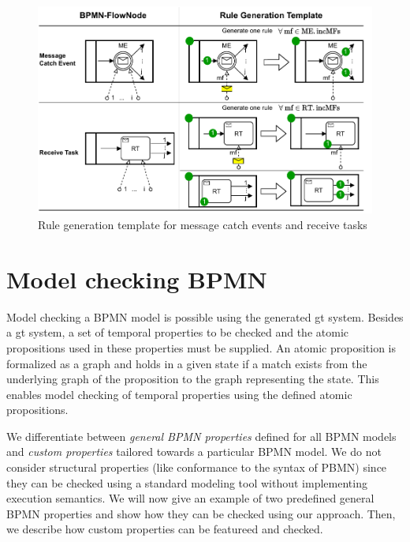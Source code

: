 \documentclass[runningheads]{llncs}
\begin{document}
\begin{figure}[ht]
    \centering
    \includegraphics[width=1\textwidth]{images/catch_messages.pdf}
    \caption{Rule generation template for message catch events and receive tasks}
    \label{fig:catchMessageTemplates}
\end{figure}


\section{Model checking BPMN} \label{sec:modelChecking}

Model checking a BPMN model is possible using the generated \gls*{gt} system.
Besides a \gls*{gt} system, a set of temporal properties to be checked and the atomic propositions used in these properties must be supplied.
An atomic proposition is formalized as a graph and holds in a given state if a match exists from the underlying graph of the proposition to the graph representing the state.
This enables model checking of temporal properties using the defined atomic propositions.

We differentiate between \emph{general BPMN properties} defined for all BPMN models and \emph{custom properties} tailored towards a particular BPMN model.
We do not consider structural properties (like conformance to the syntax of PBMN) since they can be checked using a standard modeling tool without implementing execution semantics.
We will now give an example of two predefined general BPMN properties and show how they can be checked using our approach.
Then, we describe how custom properties can be featureed and checked.
\end{document}
